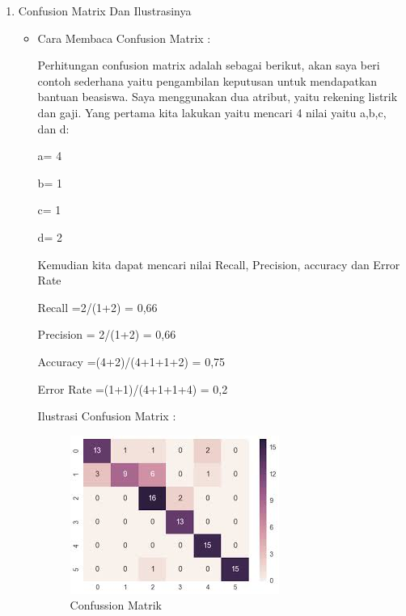 \begin{enumerate}
\par
\item Confusion Matrix Dan Ilustrasinya
\begin{itemize}
\item Cara Membaca Confusion Matrix :
\par Perhitungan confusion matrix adalah sebagai berikut, akan saya beri contoh sederhana yaitu pengambilan keputusan untuk mendapatkan bantuan beasiswa. Saya menggunakan dua atribut, yaitu rekening listrik dan gaji. Yang pertama kita lakukan yaitu mencari 4 nilai yaitu a,b,c, dan d:
\par a= 4
\par b= 1
\par c= 1
\par d= 2
\par Kemudian kita dapat mencari nilai Recall, Precision, accuracy dan Error Rate
\par Recall =2/(1+2) = 0,66
\par  Precision = 2/(1+2) = 0,66
\par Accuracy =(4+2)/(4+1+1+2) = 0,75
\par Error Rate =(1+1)/(4+1+1+4) = 0,2
\par Ilustrasi Confusion Matrix :
\par
\begin{figure}[ht]
\centering
\includegraphics[scale=0.8]{figures/aku3.jpg}
\caption{Confussion Matrik}
\label{contoh}
\end{figure}
\end{itemize}


\end{enumerate}

